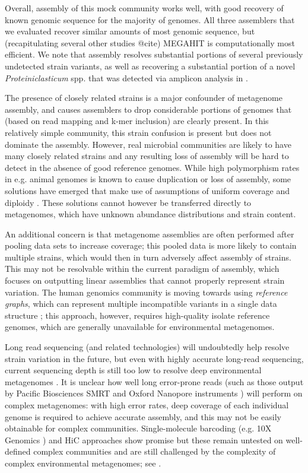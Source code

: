 \documentclass[11pt]{article}
\begin{document}
Overall, assembly of this mock community works well, with good
recovery of known genomic sequence for the majority of genomes.  All
three assemblers that we evaluated recover similar amounts of most
genomic sequence, but (recapitulating several other studies @cite)
MEGAHIT is computationally most efficient.
We note that assembly
resolves substantial portions of several previously undetected strain
variants, as well as recovering a substantial portion of a novel
{\em Proteiniclasticum} spp. that was detected via amplicon analysis
in \cite{podar}.  

The presence of closely related strains is a major confounder of
metagenome assembly, and causes assemblers to drop considerable
portions of genomes that (based on read mapping and k-mer inclusion)
are clearly present.  In this relatively simple community, this strain
confusion is present but does not dominate the assembly.  However,
real microbial communities are likely to have many closely related
strains and any resulting loss of assembly will be hard to detect in
the absence of good reference genomes.  While high polymorphism rates
in e.g. animal genomes is known to cause duplication or loss of
assembly, some solutions have emerged that make use of assumptions of
uniform coverage and diploidy \cite{Kim2007}.  These solutions cannot
however be transferred directly to metagenomes, which have unknown
abundance distributions and strain content.

An additional concern is that metagenome assemblies are often
performed after pooling data sets to increase coverage; this pooled
data is more likely to contain multiple strains, which would then in
turn adversely affect assembly of strains.  This may not be resolvable
within the current paradigm of assembly, which focuses on outputting
linear assemblies that cannot properly represent strain variation.
The human genomics community is moving towards using {\em reference
  graphs}, which can represent multiple incompatible variants in a
single data structure \cite{paten2017genome}; this approach, however,
requires high-quality isolate reference genomes, which are generally
unavailable for environmental metagenomes.

Long read sequencing (and related technologies) will undoubtedly help
resolve strain variation in the future, but even with highly accurate
long-read sequencing, current sequencing depth is still too low to
resolve deep environmental metagenomes \cite{Sharon2015,White2016}.
It is unclear how well long error-prone reads (such as those output by
Pacific Biosciences SMRT \cite{Eid2009} and Oxford Nanopore
instruments \cite{Cherf2012}) will perform on complex metagenomes:
with high error rates, deep coverage of each individual genome is
required to achieve accurate assembly, and this may not be easily
obtainable for complex communities.  Single-molecule barcoding
(e.g. 10X Genomics \cite{10.1101/125211}) and HiC approaches
\cite{SmukowskiHeil150722} show promise but these remain untested on
well-defined complex communities and are still challenged by the
complexity of complex environmental metagenomes; see
\cite{Burton2014,Marbouty2014,Beitel2014}.
\end{document}
